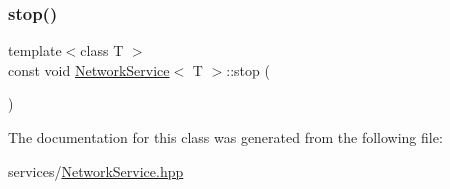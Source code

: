 \mbox{\label{classNetworkService_a27bc847ca2e677729d2ca9cec06afeef}} 
\subsubsection{\texorpdfstring{stop()}{stop()}}
{\footnotesize\ttfamily template$<$class T $>$ \\
const void \mbox{\hyperlink{classNetworkService}{Network\+Service}}$<$ T $>$\+::stop (\begin{DoxyParamCaption}{ }\end{DoxyParamCaption})\hspace{0.3cm}{\ttfamily [inline]}}



The documentation for this class was generated from the following file\+:\begin{DoxyCompactItemize}
\item 
services/\mbox{\hyperlink{NetworkService_8hpp}{Network\+Service.\+hpp}}\end{DoxyCompactItemize}
